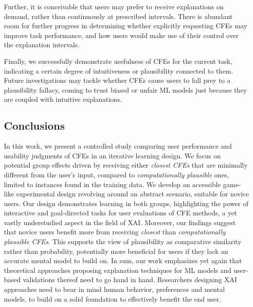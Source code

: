 Further, it is conceivable that users may prefer to receive explanations on demand, rather than continuously at prescribed intervals.
There is abundant room for further progress in determining whether explicitly requesting \glspl{CFE} may improve task performance, and how users would make use of their control over the explanation intervals.

Finally, we successfully demonstrate usefulness of \glspl{CFE} for the current task, indicating a certain degree of intuitiveness or plausibility connected to them. 
Future investigations may tackle whether \glspl{CFE} cause users to fall prey to a plausibility fallacy, coming to trust biased or unfair ML models just because they are coupled with intuitive explanations.

\subsection{Conclusions}\label{subsec:conclusion}
In this work, we present a controlled study comparing user performance and usability judgments of \glspl{CFE} in an iterative learning design.
We focus on potential group effects driven by receiving either \textit{closest \glspl{CFE}} that are minimally different from the user's input, compared to \textit{computationally plausible} ones, limited to instances found in the training data.
We develop an accessible game-like experimental design revolving around an abstract scenario, suitable for novice users.
Our design demonstrates learning in both groups, highlighting the power of interactive and goal-directed tasks for user evaluations of \gls{CFE} methods, a yet vastly understudied aspect in the field of \gls{XAI}.
Moreover, our findings suggest that novice users benefit more from receiving \textit{closest} than \textit{computationally plausible \glspl{CFE}}.
This supports the view of plausibility as comparative similarity rather than probability, potentially more beneficial for users if they lack an accurate mental model to build on.
In sum, our work emphasizes yet again that theoretical approaches proposing explanation techniques for \gls{ML} models and user-based validations thereof need to go hand in hand.
Researchers designing \gls{XAI} approaches need to bear in mind human behavior, preferences and mental models, to build on a solid foundation to effectively benefit the end user.

